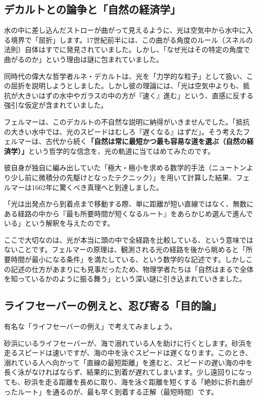 \subsection{デカルトとの論争と「自然の経済学」}

水の中に差し込んだストローが曲がって見えるように、光は空気中から水中に入る境界で「屈折」します。17世紀前半には、この曲がる角度のルール（スネルの法則）自体はすでに発見されていました。しかし、「なぜ光はその特定の角度で曲がるのか」という理由は謎に包まれていました。

同時代の偉大な哲学者ルネ・デカルトは、光を「力学的な粒子」として扱い、この屈折を説明しようとしました。しかし彼の理論には、「光は空気中よりも、抵抗が大きいはずの水中やガラスの中の方が『速く』進む」という、直感に反する強引な仮定が含まれていました。

フェルマーは、このデカルトの不自然な説明に納得がいきませんでした。「抵抗の大きい水中では、光のスピードはむしろ『遅くなる』はずだ」。そう考えたフェルマーは、古代から続く\textbf{「自然は常に最短かつ最も容易な道を選ぶ（自然の経済学）」}という哲学的な信念を、光の軌道に当てはめてみたのです。

彼自身が独自に編み出していた「極大・極小を求める数学的手法（ニュートンより少し前に微積分の先駆けとなったテクニック）」を用いて計算した結果、フェルマーは1662年に驚くべき真理へと到達しました。

「光は出発点から到着点まで移動する際、単に距離が短い直線ではなく、無数にある経路の中から『最も所要時間が短くなるルート』をあらかじめ選んで進んでいる」という解釈を与えたのです。

ここで大切なのは、光が本当に頭の中で全経路を比較している、という意味ではないことです。フェルマーの原理は、観測される光の経路を後から眺めると「所要時間が最小になる条件」を満たしている、という数学的な記述です。しかしこの記述の仕方があまりにも見事だったため、物理学者たちは「自然はまるで全体を知っているかのように振る舞う」という深い謎に引き込まれていきました。

\subsection{ライフセーバーの例えと、忍び寄る「目的論」}

有名な「ライフセーバーの例え」で考えてみましょう。

砂浜にいるライフセーバーが、海で溺れている人を助けに行くとします。砂浜を走るスピードは速いですが、海の中を泳ぐスピードは遅くなります。このとき、溺れている人へ向かって「直線の最短距離」を進むと、スピードの遅い海の中を長く泳がなければならず、結果的に到着が遅れてしまいます。少し遠回りになっても、砂浜を走る距離を長めに取り、海を泳ぐ距離を短くする「絶妙に折れ曲がったルート」を通るのが、最も早く到着する正解（最短時間）です。

